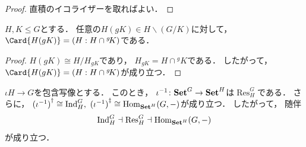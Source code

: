 \documentclass{jlreq}
\newcommand{\Index}[2]{\left(#2 : #1\right)}
\newcommand{\Res}[2]{\mathop{\mathrm{Res}}\nolimits^{#1}_{#2}}
\newcommand{\Ind}[2]{\mathop{\mathrm{Ind}}\nolimits_{#1}^{#2}}
\newcommand{\Conj}[1]{{}^{#1}\!}
\newcommand{\Stab}[2]{{#2}_{#1}}
\newcommand{\Lan}[1]{{#1}^\dagger}
\newcommand{\Ran}[1]{{#1}^\ddagger}
\begin{document}
	\begin{proof}
		直積のイコライザーを取ればよい．
	\end{proof}
	
	\begin{proposition}
		$H, K \le G$とする．
		任意の$H(gK) \in H \backslash (G/K)$に対して，
		$\Card{H(gK)} = \Index{H \cap \Conj{g}K}{H}$である．
	\end{proposition}
	
	\begin{proof}
		$H(gK) \cong H/\Stab{gK}{H}$であり，
		$\Stab{gK}{H} = H \cap \Conj{g}K$である．
		したがって，
		$\Card{H(gK)} = \Index{H \cap \Conj{g}K}{H}$が成り立つ．
	\end{proof}
	
	\begin{proposition}
		$\iota H \to G$を包含写像とする．
		このとき，
		$\iota^{-1} \colon {\mathbf{Set}}^{G} \to {\mathbf{Set}}^{H}$は$\Res{G}{H}$である．
		さらに，
		$\Lan{(\iota^{-1})} \cong \Ind{H}{G},\ \Ran{(\iota^{-1})} \cong \Hom[\FunctCat{H}{\CatSets}](G, {-})$が成り立つ．
		したがって，
		随伴
		\begin{equation}
			\Ind{H}{G} \dashv \Res{G}{H} \dashv \Hom[\FunctCat{H}{\CatSets}](G, {-})
		\end{equation}
		が成り立つ．
	\end{proposition}
	
\end{document}
